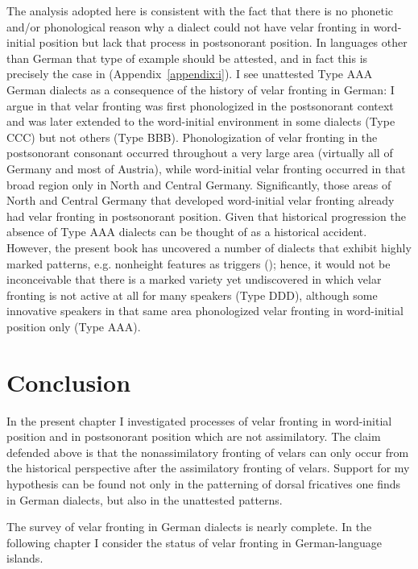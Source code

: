 The analysis adopted here is consistent with the fact that there is no phonetic and/or phonological reason why a dialect could not have velar fronting in word-initial position but lack that process in postsonorant position. In languages other than German that type of example should be attested, and in fact this is precisely the case in  (Appendix~\ref{appendix:i}). I see unattested Type AAA German dialects as a consequence of the history of velar fronting in German: I argue in  that velar fronting was first phonologized in the postsonorant context and was later extended to the word-initial environment in some dialects (Type CCC) but not others (Type BBB). Phonologization of velar fronting in the postsonorant consonant occurred throughout a very large area (virtually all of Germany and most of Austria), while word-initial velar fronting occurred in that broad region only in North and Central Germany. Significantly, those areas of North and Central Germany that developed word-initial velar fronting already had velar fronting in postsonorant position. Given that historical progression the absence of Type AAA dialects can be thought of as a historical accident. However, the present book has uncovered a number of dialects that exhibit highly marked patterns, e.g. nonheight features as triggers (); hence, it would not be inconceivable that there is a marked variety yet undiscovered in which velar fronting is not active at all for many speakers (Type DDD), although some innovative speakers in that same area phonologized velar fronting in word-initial position only (Type AAA).

\section{{Conclusion}}\label{sec:14.8}

In the present chapter I investigated processes of velar fronting in word-initial position and in postsonorant position which are not assimilatory. The claim defended above is that the nonassimilatory fronting of velars can only occur from the historical perspective after the assimilatory fronting of velars. Support for my hypothesis can be found not only in the patterning of dorsal fricatives one finds in German dialects, but also in the unattested patterns.

The survey of velar fronting in German dialects is nearly complete. In the following chapter I consider the status of velar fronting in German-language islands.
